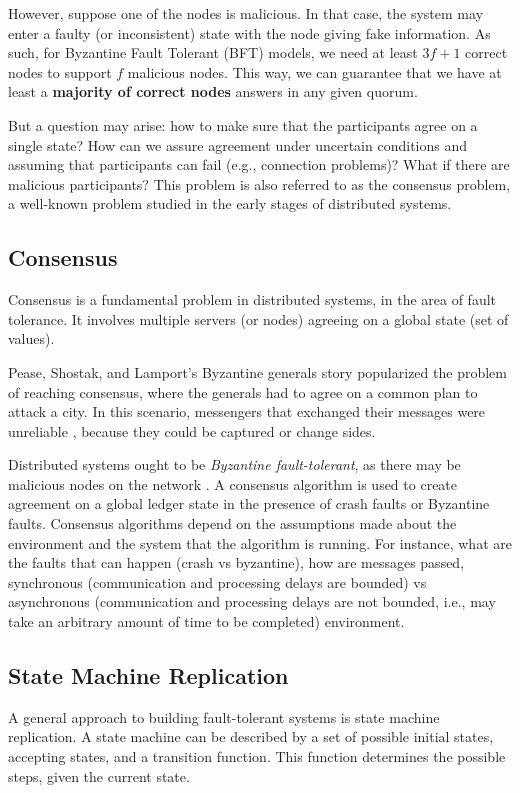 \documentclass[12pt,a4paper]{article}
\begin{document}
However, suppose one of the nodes is malicious. In that case, the system may enter a faulty (or inconsistent) state with the node giving fake information. As such, for Byzantine Fault Tolerant (BFT) models, we need at least $3f+1$ correct nodes to support $f$ malicious nodes. This way, we can guarantee that we have at least a \textbf{majority of correct nodes} answers in any given quorum.

But a question may arise: how to make sure that the participants agree on a single state? How can we assure agreement under uncertain conditions and assuming that participants can fail (e.g., connection problems)? What if there are malicious participants? This problem is also referred to as the consensus problem, a well-known problem studied in the early stages of distributed systems.


\subsection{Consensus}
Consensus is a fundamental problem in distributed systems, in the area of fault tolerance. It involves multiple servers (or nodes) agreeing on a global state (set of values).

Pease, Shostak, and Lamport's Byzantine generals story popularized the problem of reaching consensus, where the generals had to agree on a common plan to attack a city. In this scenario, messengers that exchanged their messages were unreliable \cite{byzantine_generals}, because they could be captured or change sides.

Distributed systems ought to be \emph{Byzantine fault-tolerant}, as there may be malicious nodes on the network \cite{correia2019byzantine}.  A consensus algorithm is used to create agreement on a global ledger state in the presence of crash faults or Byzantine faults. Consensus algorithms depend on the assumptions made about the environment and the system that the algorithm is running. For instance, what are the faults that can happen (crash vs byzantine), how are messages passed, synchronous (communication and processing delays are bounded) vs asynchronous (communication and processing delays are not bounded, i.e., may take an arbitrary amount of time to be completed) environment.

\subsection{State Machine Replication}
A general approach to building fault-tolerant systems is state machine replication. A state machine can be described by a set of possible initial states,  accepting states, and a transition function. This function determines the possible steps, given the current state.
\end{document}
